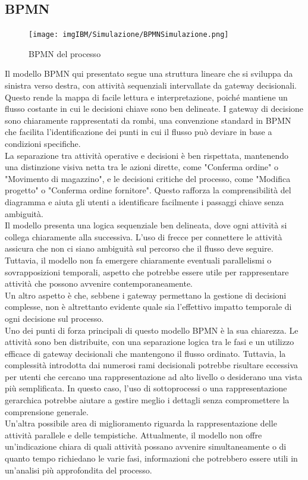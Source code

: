 \documentclass{article}
\begin{document}
 \subsection{BPMN}
 \begin{figure}[H]
    \centering
    \texttt{[image: imgIBM/Simulazione/BPMNSimulazione.png]}
    \caption{BPMN del processo}
    \label{fig:process-BPMN}
\end{figure}
Il modello BPMN qui presentato segue una struttura lineare che si sviluppa da sinistra verso destra, con attività sequenziali intervallate da gateway decisionali. Questo rende la mappa di facile lettura e interpretazione, poiché mantiene un flusso costante in cui le decisioni chiave sono ben delineate. I gateway di decisione sono chiaramente rappresentati da rombi, una convenzione standard in BPMN che facilita l'identificazione dei punti in cui il flusso può deviare in base a condizioni specifiche.\\
La separazione tra attività operative e decisioni è ben rispettata, mantenendo una distinzione visiva netta tra le azioni dirette, come "Conferma ordine" o "Movimento di magazzino", e le decisioni critiche del processo, come "Modifica progetto" o "Conferma ordine fornitore". Questo rafforza la comprensibilità del diagramma e aiuta gli utenti a identificare facilmente i passaggi chiave senza ambiguità.\\
Il modello presenta una logica sequenziale ben delineata, dove ogni attività si collega chiaramente alla successiva. L'uso di frecce per connettere le attività assicura che non ci siano ambiguità sul percorso che il flusso deve seguire. Tuttavia, il modello non fa emergere chiaramente eventuali parallelismi o sovrapposizioni temporali, aspetto che potrebbe essere utile per rappresentare attività che possono avvenire contemporaneamente.\\
Un altro aspetto è che, sebbene i gateway permettano la gestione di decisioni complesse, non è altrettanto evidente quale sia l'effettivo impatto temporale di ogni decisione sul processo.\\
Uno dei punti di forza principali di questo modello BPMN è la sua chiarezza. Le attività sono ben distribuite, con una separazione logica tra le fasi e un utilizzo efficace di gateway decisionali che mantengono il flusso ordinato. Tuttavia, la complessità introdotta dai numerosi rami decisionali potrebbe risultare eccessiva per utenti che cercano una rappresentazione ad alto livello o desiderano una vista più semplificata. In questo caso, l'uso di sottoprocessi o una rappresentazione gerarchica potrebbe aiutare a gestire meglio i dettagli senza compromettere la comprensione generale.\\
Un'altra possibile area di miglioramento riguarda la rappresentazione delle attività parallele e delle tempistiche. Attualmente, il modello non offre un’indicazione chiara di quali attività possano avvenire simultaneamente o di quanto tempo richiedano le varie fasi, informazioni che potrebbero essere utili in un'analisi più approfondita del processo.
\end{document}
